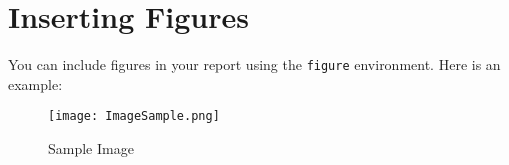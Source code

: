 \documentclass{../LatexStyle/style}
\begin{document}
\section{Inserting Figures}
You can include figures in your report using the \texttt{figure} environment. Here is an example:   
\begin{figure}[h]
    \centering
    \texttt{[image: ImageSample.png]} %
    \caption{Sample Image}
    \label{fig:sample-figure}
\end{figure}
\end{document}
